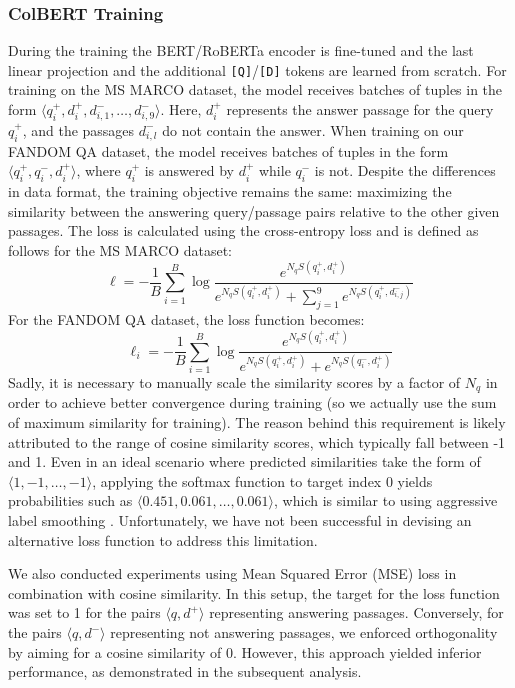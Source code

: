 \documentclass{article}
\begin{document}
\subsubsection{ColBERT Training}
During the training the BERT/RoBERTa encoder is fine-tuned and the last linear projection and the additional \texttt{[Q]}/\texttt{[D]} tokens are learned from scratch. For training on the MS MARCO \cite{bajaj2018ms} dataset, the model receives batches of tuples in the form $\langle q_i^+, d_i^+, d_{i, 1}^-, \dots, d_{i, 9}^-\rangle$. Here, $d_i^+$ represents the answer passage for the query $q_i^+$, and the passages $d_{i, l}^-$ do not contain the answer. When training on our FANDOM QA dataset, the model receives batches of tuples in the form $\langle q_i^+, q_i^-, d_i^+\rangle$, where $q_i^+$ is answered by $d_i^+$ while $q_i^-$ is not. Despite the differences in data format, the training objective remains the same: maximizing the similarity between the answering query/passage pairs relative to the other given passages. The loss is calculated using the cross-entropy loss and is defined as follows for the MS MARCO dataset:
$$
\ell = -\frac{1}{B} \sum_{i=1}^{B} \log \frac{e^{N_q S(q_i^+, d_i^+)}}{e^{N_q S(q_i^+, d_i^+)} + \sum_{j=1}^{9}{e^{N_q S(q_i^+, d_{i, j}^-)}}}
$$
For the FANDOM QA dataset, the loss function becomes:
$$
\ell_i = -\frac{1}{B} \sum_{i=1}^{B} \log \frac{e^{N_q S(q_i^+, d_i^+)}}{e^{N_q S(q_i^+, d_i^+)} + e^{N_q S(q_i^-, d_i^+)}}
$$
Sadly, it is necessary to manually scale the similarity scores by a factor of $N_q$ in order to achieve better convergence during training (so we actually use the sum of maximum similarity for training). The reason behind this requirement is likely attributed to the range of cosine similarity scores, which typically fall between -1 and 1. Even in an ideal scenario where predicted similarities take the form of $\langle 1, -1, \dots, -1\rangle$, applying the softmax function to target index 0 yields probabilities such as $\langle 0.451, 0.061, \dots, 0.061\rangle$, which is similar to using aggressive label smoothing \cite{szegedy2015rethinking}. Unfortunately, we have not been successful in devising an alternative loss function to address this limitation.

We also conducted experiments using Mean Squared Error (MSE) loss in combination with cosine similarity. In this setup, the target for the loss function was set to 1 for the pairs $\langle q, d^+\rangle$ representing answering passages. Conversely, for the pairs $\langle q, d^-\rangle$ representing not answering passages, we enforced orthogonality by aiming for a cosine similarity of 0. However, this approach yielded inferior performance, as demonstrated in the subsequent analysis.
\end{document}

